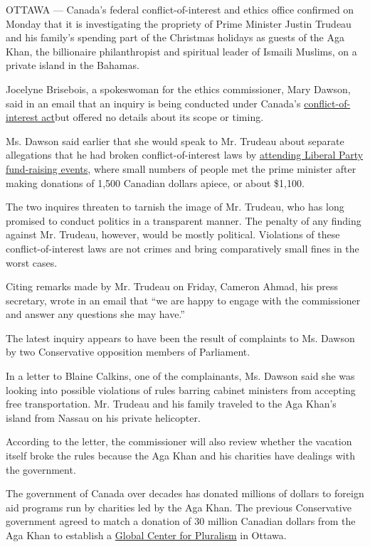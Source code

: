 OTTAWA --- Canada's federal conflict-of-interest and ethics office
confirmed on Monday that it is investigating the propriety of Prime
Minister Justin Trudeau and his family's spending part of the Christmas
holidays as guests of the Aga Khan, the billionaire philanthropist and
spiritual leader of Ismaili Muslims, on a private island in the Bahamas.

Jocelyne Brisebois, a spokeswoman for the ethics commissioner, Mary
Dawson, said in an email that an inquiry is being conducted under
Canada's
\href{http://ciec-ccie.parl.gc.ca/EN/Pages/ConflictOfInterestAct.aspx}{conflict-of-interest
act}but offered no details about its scope or timing.

Ms. Dawson said earlier that she would speak to Mr. Trudeau about
separate allegations that he had broken conflict-of-interest laws by
\href{https://www.nytimes.com/2016/11/24/world/americas/canada-justin-trudeau-donors.html}{attending
Liberal Party fund-raising events}, where small numbers of people met
the prime minister after making donations of 1,500 Canadian dollars
apiece, or about \$1,100.

The two inquires threaten to tarnish the image of Mr. Trudeau, who has
long promised to conduct politics in a transparent manner. The penalty
of any finding against Mr. Trudeau, however, would be mostly political.
Violations of these conflict-of-interest laws are not crimes and bring
comparatively small fines in the worst cases.

Citing remarks made by Mr. Trudeau on Friday, Cameron Ahmad, his press
secretary, wrote in an email that ``we are happy to engage with the
commissioner and answer any questions she may have.''

The latest inquiry appears to have been the result of complaints to Ms.
Dawson by two Conservative opposition members of Parliament.

In a letter to Blaine Calkins, one of the complainants, Ms. Dawson said
she was looking into possible violations of rules barring cabinet
ministers from accepting free transportation. Mr. Trudeau and his family
traveled to the Aga Khan's island from Nassau on his private helicopter.

According to the letter, the commissioner will also review whether the
vacation itself broke the rules because the Aga Khan and his charities
have dealings with the government.

The government of Canada over decades has donated millions of dollars to
foreign aid programs run by charities led by the Aga Khan. The previous
Conservative government agreed to match a donation of 30 million
Canadian dollars from the Aga Khan to establish a
\href{http://www.pluralism.ca/en/}{Global Center for Pluralism} in
Ottawa.

